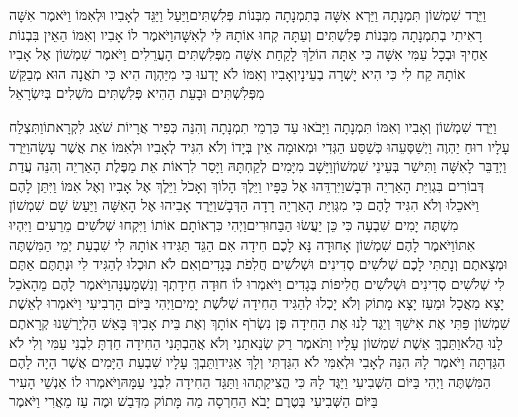 \documentclass[../main/main.tex]{subfiles}
\begin{document}
\begin{multicols*}{\ncols}
וַיֵּרֶד שִׁמְשׁוֹן תִּמְנָתָה וַיַּרְא אִשָּׁה בְּתִמְנָתָה מִבְּנוֹת פְּלִשְׁתִּים\PreVerseSpace{}וַיַּעַל וַיַּגֵּד לְאָבִיו וּלְאִמּוֹ וַיֹּאמֶר אִשָּׁה רָאִיתִי בְתִמְנָתָה מִבְּנוֹת פְּלִשְׁתִּים וְעַתָּה קְחוּ אוֹתָהּ לִּי לְאִשָּׁה\PreVerseSpace{}וַיֹּאמֶר לוֹ אָבִיו וְאִמּוֹ הַאֵין בִּבְנוֹת אַחֶיךָ וּבְכָל עַמִּי אִשָּׁה כִּי אַתָּה הוֹלֵךְ לָקַחַת אִשָּׁה מִפְּלִשְׁתִּים הָעֲרֵלִים וַיֹּאמֶר שִׁמְשׁוֹן אֶל אָבִיו אוֹתָהּ קַח לִי כִּי הִיא יָשְׁרָה בְעֵינָי\PreVerseSpace{}וְאָבִיו וְאִמּוֹ לֹא יָדְעוּ כִּי מִיַּהְוֶה הִיא כִּי תֹאֲנָה הוּא מְבַקֵּשׁ מִפְּלִשְׁתִּים וּבָעֵת הַהִיא פְּלִשְׁתִּים מֹשְׁלִים בְּיִשְׂרָאֵל\OpenSection{}\par
{}וַיֵּרֶד שִׁמְשׁוֹן וְאָבִיו וְאִמּוֹ תִּמְנָתָה וַיָּבֹאוּ עַד כַּרְמֵי תִמְנָתָה וְהִנֵּה כְּפִיר אֲרָיוֹת שֹׁאֵג לִקְרָאתוֹ\PreVerseSpace{}וַתִּצְלַח עָלָיו רוּחַ יַהְוֶה וַיְשַׁסְּעֵהוּ כְּשַׁסַּע הַגְּדִי וּמְאוּמָה אֵין בְּיָדוֹ וְלֹא הִגִּיד לְאָבִיו וּלְאִמּוֹ אֵת אֲשֶׁר עָשָׂה\PreVerseSpace{}וַיֵּרֶד וַיְדַבֵּר לָאִשָּׁה וַתִּישַׁר בְּעֵינֵי שִׁמְשׁוֹן\PreVerseSpace{}וַיָּשָׁב מִיָּמִים לְקַחְתָּהּ וַיָּסַר לִרְאוֹת אֵת מַפֶּלֶת הָאַרְיֵה וְהִנֵּה עֲדַת דְּבוֹרִים בִּגְוִיַּת הָאַרְיֵה וּדְבָשׁ\PreVerseSpace{}וַיִּרְדֵּהוּ אֶל כַּפָּיו וַיֵּלֶךְ הָלוֹךְ וְאָכֹל וַיֵּלֶךְ אֶל אָבִיו וְאֶל אִמּוֹ וַיִּתֵּן לָהֶם וַיֹּאכֵלוּ וְלֹא הִגִּיד לָהֶם כִּי מִגְּוִיַּת הָאַרְיֵה רָדָה הַדְּבָשׁ\PreVerseSpace{}וַיֵּרֶד אָבִיהוּ אֶל הָאִשָּׁה וַיַּעַשׂ שָׁם שִׁמְשׁוֹן מִשְׁתֶּה יָמִים שִׁבְעָה\OmitEnd{} כִּי כֵּן יַעֲשׂוּ הַבַּחוּרִים\PreVerseSpace{}וַיְהִי כִּרְאוֹתָם אוֹתוֹ וַיִּקְחוּ שְׁלֹשִׁים מֵרֵעִים וַיִּהְיוּ אִתּוֹ\PreVerseSpace{}וַיֹּאמֶר לָהֶם שִׁמְשׁוֹן אָחוּדָה נָּא לָכֶם חִידָה אִם הַגֵּד תַּגִּידוּ אוֹתָהּ לִי שִׁבְעַת יְמֵי הַמִּשְׁתֶּה וּמְצָאתֶם וְנָתַתִּי לָכֶם שְׁלֹשִׁים סְדִינִים וּשְׁלֹשִׁים חֲלִפֹת בְּגָדִים\PreVerseSpace{}וְאִם לֹא תוּכְלוּ לְהַגִּיד לִי וּנְתַתֶּם אַתֶּם לִי שְׁלֹשִׁים סְדִינִים וּשְׁלֹשִׁים חֲלִיפוֹת בְּגָדִים וַיֹּאמְרוּ לוֹ חוּדָה חִידָתְךָ וְנִשְׁמָעֶנָּה\PreVerseSpace{}וַיֹּאמֶר לָהֶם מֵהָאֹכֵל יָצָא מַאֲכָל וּמֵעַז יָצָא מָתוֹק וְלֹא יָכְלוּ לְהַגִּיד הַחִידָה שְׁלֹשֶׁת יָמִים\PreVerseSpace{}וַיְהִי בַּיּוֹם הָרְבִיעִי\SubEnd{} וַיֹּאמְרוּ לְאֵשֶׁת שִׁמְשׁוֹן פַּתִּי אֶת אִישֵׁךְ וְיַגֶּד לָנוּ אֶת הַחִידָה פֶּן נִשְׂרֹף אוֹתָךְ וְאֶת בֵּית אָבִיךְ בָּאֵשׁ הַלְיָרְשֵׁנוּ קְרָאתֶם לָנוּ הֲלֹא\PreVerseSpace{}וַתֵּבְךְּ אֵשֶׁת שִׁמְשׁוֹן עָלָיו וַתֹּאמֶר רַק שְׂנֵאתַנִי וְלֹא אֲהַבְתָּנִי הַחִידָה חַדְתָּ לִבְנֵי עַמִּי וְלִי לֹא הִגַּדְתָּה וַיֹּאמֶר לָהּ הִנֵּה לְאָבִי וּלְאִמִּי לֹא הִגַּדְתִּי וְלָךְ אַגִּיד\PreVerseSpace{}וַתֵּבְךְּ עָלָיו שִׁבְעַת הַיָּמִים אֲשֶׁר הָיָה לָהֶם הַמִּשְׁתֶּה וַיְהִי בַּיּוֹם הַשְּׁבִיעִי וַיַּגֶּד לָהּ כִּי הֱצִיקַתְהוּ וַתַּגֵּד הַחִידָה לִבְנֵי עַמָּהּ\PreVerseSpace{}וַיֹּאמְרוּ לוֹ אַנְשֵׁי הָעִיר בַּיּוֹם הַשְּׁבִיעִי בְּטֶרֶם יָבֹא הַחַרְסָה מַה מָּתוֹק מִדְּבַשׁ וּמֶה עַז מֵאֲרִי וַיֹּאמֶר 
\end{multicols*}
\end{document}
